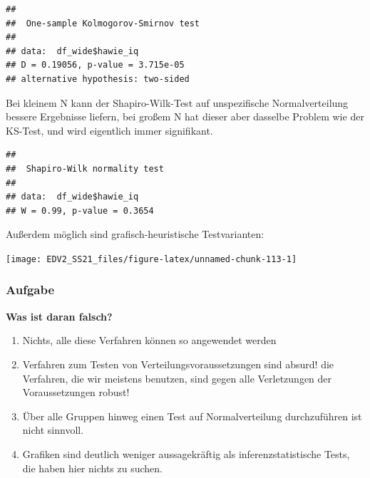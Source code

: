 \documentclass[
]{book}
\newenvironment{Shaded}{\begin{snugshade}}{\end{snugshade}}
\newcommand{\AttributeTok}[1]{\textcolor[rgb]{0.77,0.63,0.00}{#1}}
\newcommand{\DecValTok}[1]{\textcolor[rgb]{0.00,0.00,0.81}{#1}}
\newcommand{\FunctionTok}[1]{\textcolor[rgb]{0.00,0.00,0.00}{#1}}
\newcommand{\NormalTok}[1]{#1}
\newcommand{\SpecialCharTok}[1]{\textcolor[rgb]{0.00,0.00,0.00}{#1}}
\newcommand{\StringTok}[1]{\textcolor[rgb]{0.31,0.60,0.02}{#1}}
\begin{document}
\begin{Shaded}
\end{Shaded}

\begin{verbatim}
## 
##  One-sample Kolmogorov-Smirnov test
## 
## data:  df_wide$hawie_iq
## D = 0.19056, p-value = 3.715e-05
## alternative hypothesis: two-sided
\end{verbatim}

Bei kleinem N kann der Shapiro-Wilk-Test auf unspezifische Normalverteilung bessere Ergebnisse liefern, bei großem N hat dieser aber dasselbe Problem wie der KS-Test, und wird eigentlich immer signifikant.

\begin{Shaded}
\end{Shaded}

\begin{verbatim}
## 
##  Shapiro-Wilk normality test
## 
## data:  df_wide$hawie_iq
## W = 0.99, p-value = 0.3654
\end{verbatim}

Außerdem möglich sind grafisch-heuristische Testvarianten:

\begin{center}\texttt{[image: EDV2\_SS21\_files/figure-latex/unnamed-chunk-113-1]} \end{center}

\hypertarget{aufgabe-7}{%
\subsubsection{Aufgabe}\label{aufgabe-7}}

\textbf{Was ist daran falsch?}

\begin{enumerate}
\def\labelenumi{\arabic{enumi}.}
\item
  Nichts, alle diese Verfahren können so angewendet werden
\item
  Verfahren zum Testen von Verteilungsvoraussetzungen sind absurd! die Verfahren, die wir meistens benutzen, sind gegen alle Verletzungen der Voraussetzungen robust!
\item
  Über alle Gruppen hinweg einen Test auf Normalverteilung durchzuführen ist nicht sinnvoll.
\item
  Grafiken sind deutlich weniger aussagekräftig als inferenzstatistische Tests, die haben hier nichts zu suchen.
\end{enumerate}
\end{document}
